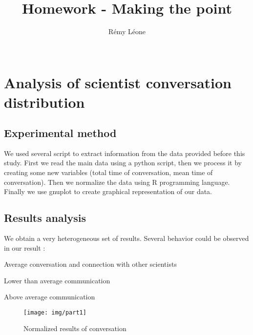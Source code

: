 \documentclass{sig-alternate-10pt}
\begin{document}
\title{Homework - Making the point}


\author{
  \alignauthor
    Rémy Léone\\
    \\
}

\maketitle

\section{Analysis of scientist conversation distribution}

\subsection{Experimental method}

We used several script to extract information from the data provided before this study.
First we read the main data using a python script, then we process it by creating some 
new variables (total time of conversation, mean time of conversation). Then we normalize
the data using R programming language. Finally we use gnuplot to create graphical representation
of our data.

\subsection{Results analysis}

We obtain a very heterogeneous set of results. Several behavior could be observed in our result :
\begin{description}
\item Average conversation and connection with other scientists
\item Lower than average communication
\item Above average communication
\end{description}

\begin{figure}[h]
\begin{center}
\texttt{[image: img/part1]}
\end{center}
\caption{Normalized results of conversation}
\end{figure}
\end{document}
